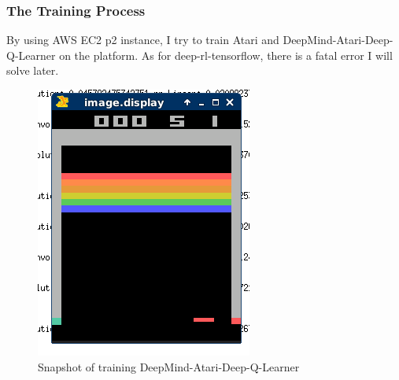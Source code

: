 \documentclass[10pt,twocolumn,letterpaper]{article}
\begin{document}
\subsubsection{The Training Process}
By using AWS EC2 p2 instance, I try to train Atari and DeepMind-Atari-Deep-Q-Learner on the platform. As for deep-rl-tensorflow, there is a fatal error I will solve later.
\begin{figure}[H]
	\begin{center}
		\includegraphics[width=0.8\linewidth]{img/fig1.png}
	\end{center}
	\caption{Snapshot of training  DeepMind-Atari-Deep-Q-Learner}
	\label{fig:long}
	\label{fig:onecol}
\end{figure}
\end{document}
